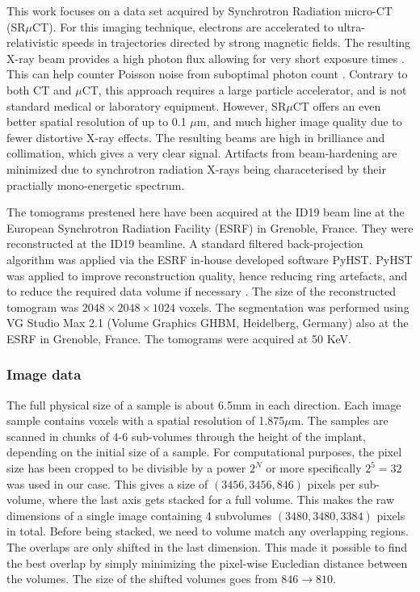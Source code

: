 This work focuses on a data set acquired by Synchrotron Radiation micro-CT (SR$\mu$CT). For this
imaging technique, electrons are accelerated to ultra-relativistic speeds in trajectories directed
by strong magnetic fields. The resulting X-ray beam provides a high photon flux allowing for very
short exposure times \citep{srexptime}. This can help counter Poisson noise from suboptimal photon
count \citep{srnoise}. Contrary to both CT and $\mu$CT, this approach requires a large particle
accelerator, and is not standard medical or laboratory equipment. However, SR$\mu$CT  offers an
even better spatial resolution of up to 0.1 $\mu$m, and much higher image quality due to fewer
distortive X-ray effects. The resulting beams are high in brilliance and collimation, which gives
a very clear signal. Artifacts from beam-hardening are minimized due to synchrotron radiation
X-rays being characeterised by their practially mono-energetic spectrum.

The tomograms prestened here have been acquired at the ID19 beam line at the European Synchrotron
Radiation Facility (ESRF) in Grenoble, France. They were reconstructed\citep{sporring} at the
ID19 beamline. A standard filtered back-projection algorithm was applied via the ESRF in-house developed
software PyHST\citep{pyhst}. PyHST was applied to improve reconstruction quality, hence reducing ring
artefacts, and to reduce the required data volume if necessary . The
size of the reconstructed tomogram was $2048 \times 2048 \times 1024$ voxels. The segmentation was
performed using VG Studio Max 2.1 (Volume Graphics GHBM, Heidelberg, Germany) also at the ESRF in
Grenoble, France. The tomograms were acquired at 50 KeV.

\subsubsection{Image data}

The full physical size of a sample is about 6.5mm in each direction. Each image sample contains
voxels with a spatial resolution of 1.875$\mu$m. The samples are scanned in chunks of 4-6
sub-volumes through the height of the implant, depending on the initial size of a sample.
For computational purposes, the pixel size has been cropped to be divisible by a power $2^N$ or
more specifically $2^5=32$ was used in our case. This gives a size of $(3456,3456,846)$ pixels
per sub-volume, where the last axis gets stacked for a full volume. This makes the raw dimensions
of a single image containing 4 subvolumes $(3480,3480,3384)$ pixels in total. Before being stacked,
we need to volume match any overlapping regions. The overlaps are only shifted in the last dimension.
This made it possible to find the best overlap by simply minimizing the pixel-wise Eucledian distance
between the volumes. The size of the shifted volumes goes from $846 \rightarrow 810$.

